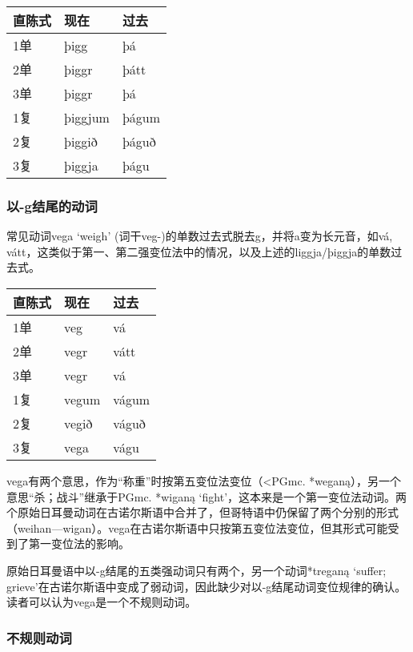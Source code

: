 \begin{longtable}{lll}
    \toprule
    直陈式 & 现在    & 过去  \\
    \midrule
    \endhead
    \bottomrule
    \endfoot
    1单    & þigg    & þá    \\
    2单    & þiggr   & þátt  \\
    3单    & þiggr   & þá    \\
    1复    & þiggjum & þágum \\
    2复    & þiggið  & þáguð \\
    3复    & þiggja  & þágu  \\
\end{longtable}

\subsubsection{以-g结尾的动词}

常见动词vega `weigh‌' (词干veg-)的单数过去式脱去g，并将a变为长元音，如vá, vátt，这类似于第一、第二强变位法中的情况，以及上述的liggja/þiggja的单数过去式。
\begin{longtable}{lll}
    \toprule
    直陈式 & 现在  & 过去  \\
    \midrule
    \endhead
    \bottomrule
    \endfoot
    1单    & veg   & vá    \\
    2单    & vegr  & vátt  \\
    3单    & vegr  & vá    \\
    1复    & vegum & vágum \\
    2复    & vegið & váguð \\
    3复    & vega  & vágu  \\
\end{longtable}

vega有两个意思，作为“称重”时按第五变位法变位（\textless PGmc.
*weganą），另一个意思“杀；战斗”继承于PGmc. *wiganą
`fight'，这本来是一个第一变位法动词。两个原始日耳曼动词在古诺尔斯语中合并了，但哥特语中仍保留了两个分别的形式（weihan---wigan）。vega在古诺尔斯语中只按第五变位法变位，但其形式可能受到了第一变位法的影响。

原始日耳曼语中以-g结尾的五类强动词只有两个，另一个动词*treganą `suffer; grieve'在古诺尔斯语中变成了弱动词，因此缺少对以-g结尾动词变位规律的确认。读者可以认为vega是一个不规则动词。


\subsubsection{不规则动词}

